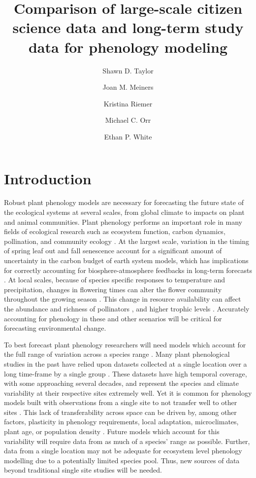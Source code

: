 \documentclass[fleqn,10pt,lineno]{wlpeerj} %
\title{Comparison of large-scale citizen science data and long-term study data for phenology modeling}
\author[1]{Shawn D. Taylor}
\author[2]{Joan M. Meiners}
\author[3]{Kristina Riemer}
\author[4]{Michael C. Orr}
\author[5]{Ethan P. White}
\affil[1,2]{UFL SNRE}
\affil[4]{Key Laboratory of Zoological Systematics and Evolution, Institute of Zoology, Chinese Academy of Sciences, Beijing 100101, P.R. China}
\affil[3,5]{UFL WEC}
\affil[5]{UFL Bioinformatics}
\begin{document}
\flushbottom
\maketitle
\thispagestyle{empty}

\section*{Introduction}

Robust plant phenology models are necessary for forecasting the future state of the ecological systems at several scales, from global climate to impacts on plant and animal communities. Plant phenology performs an important role in many fields of ecological research such as ecosystem function, carbon dynamics, pollination, and community ecology \citep{richardson2013, cleland2007, tang2016}. At the largest scale, variation in the timing of spring leaf out and fall senescence account for a significant amount of uncertainty in the carbon budget of earth system models, which has implications for correctly accounting for biosphere-atmosphere feedbacks in long-term forecasts \citep{richardson2012}. At local scales, because of species specific responses to temperature and precipitation, changes in flowering times can alter the flower community throughout the growing season \citep{caradonna2014, diez2012, theobald2017}. This change in resource availability can affect the abundance and richness of pollinators \citep{ogilvie2017a, ogilvie2017b}, and higher trophic levels \citep{tylianakis2008}. Accurately accounting for phenology in these and other scenarios will be critical for forecasting environmental change.  

To best forecast plant phenology researchers will need models which account for the full range of variation across a species range \citep{richardson2013, chuine2017}. Many plant phenological studies in the past have relied upon datasets collected at a single location over a long time-frame by a single group \citep{cook2012, roberts2015, iler2013, wolkovich2012}. These datasets have high temporal coverage, with some approaching several decades, and represent the species and climate variability at their respective sites extremely well. Yet it is common for phenology models built with observations from a single site to not transfer well to other sites \citep{garcia-mozo2008, xu2013, olsson2014, basler2016}. This lack of transferability across space can be driven by, among other factors, plasticity in phenology requirements, local adaptation, microclimates, plant age, or population density \citep{kramer1995, diez2012}. Future models which account for this variability will require data from as much of a species' range as possible. Further, data from a single location may not be adequate for ecosystem level phenology modelling due to a potentially limited species pool. Thus, new sources of data beyond traditional single site studies will be needed.
\end{document}
